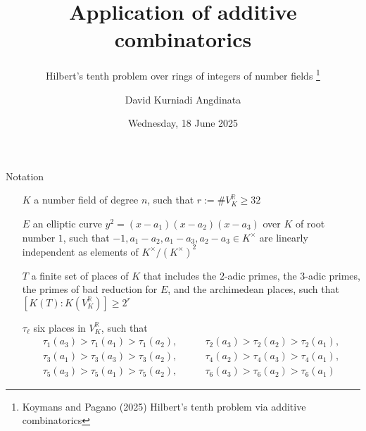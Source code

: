 \documentclass[10pt]{beamer}
\title{Application of additive combinatorics}
\subtitle{Hilbert's tenth problem over rings of integers of number fields \footnote{Koymans and Pagano (2025) Hilbert's tenth problem via additive combinatorics}}
\author{David Kurniadi Angdinata}
\institute{London School of Geometry and Number Theory}
\date{Wednesday, 18 June 2025}
\begin{document}
\frame{\titlepage}

\begin{frame}{Notation}

\begin{itemize}
\item[$ K $] a number field of degree $ n $, such that $ r := \#V_K^\mathbb{R} \ge 32 $
\item[$ E $] an elliptic curve $ y^2 = (x - a_1)(x - a_2)(x - a_3) $ over $ K $ of root number $ 1 $, such that $ -1, a_1 - a_2, a_1 - a_3, a_2 - a_3 \in K^\times $ are linearly independent as elements of $ K^\times / (K^\times)^2 $
\item[$ T $] a finite set of places of $ K $ that includes the $ 2 $-adic primes, the $ 3 $-adic primes, the primes of bad reduction for $ E $, and the archimedean places, such that $ [K(T) : K(V_K^\mathbb{R})] \ge 2^r $
\item[$ \tau_\ell $] six places in $ V_K^\mathbb{R} $, such that
\begin{align*}
\tau_1(a_3) > \tau_1(a_1) > \tau_1(a_2), & \qquad \tau_2(a_3) > \tau_2(a_2) > \tau_2(a_1), \\
\tau_3(a_1) > \tau_3(a_3) > \tau_3(a_2), & \qquad \tau_4(a_2) > \tau_4(a_3) > \tau_4(a_1), \\
\tau_5(a_3) > \tau_5(a_1) > \tau_5(a_2), & \qquad \tau_6(a_3) > \tau_6(a_2) > \tau_6(a_1)
\end{align*}
\end{itemize}

\end{frame}
\end{document}

